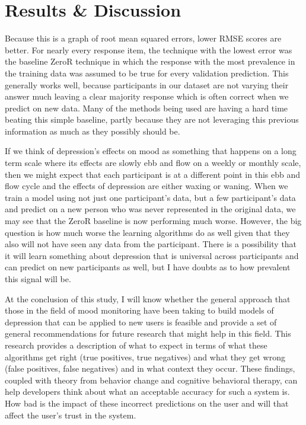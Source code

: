 \section{Results \& Discussion}

Because this is a graph of root mean squared errors, lower RMSE scores are better. For nearly every response item, the technique with the lowest error was the baseline ZeroR technique in which the response with the most prevalence in the training data was assumed to be true for every validation prediction.  This generally works well, because participants in our dataset are not varying their answer much leaving a clear majority response which is often correct when we predict on new data. Many of the methods being used are having a hard time beating this simple baseline, partly because they are not leveraging this previous information as much as they possibly should be.

If we think of depression’s effects on mood as something that happens on a long term scale where its effects are slowly ebb and flow on a weekly or monthly scale, then we might expect that each participant is at a different point in this ebb and flow cycle and the effects of depression are either waxing or waning.  When we train a model using not just one participant’s data, but a few participant’s data and predict on a new person who was never represented in the original data, we may see that the ZeroR baseline is now performing much worse.  However, the big question is how much worse the learning algorithms do as well given that they also will not have seen any data from the participant.  There is a possibility that it will learn something about depression that is universal across participants and can predict on new participants as well, but I have doubts as to how prevalent this signal will be.

At the conclusion of this study, I will know whether the general approach that those in the field of mood monitoring have been taking to build models of depression that can be applied to new users is feasible and provide a set of general recommendations for future research that might help in this field.  This research provides a description of what to expect in terms of what these algorithms get right (true positives, true negatives) and what they get wrong (false positives, false negatives) and in what context they occur.  These findings, coupled with theory from behavior change and cognitive behavioral therapy, can help developers think about what an acceptable accuracy for such a system is.  How bad is the impact of these incorrect predictions on the user and will that affect the user’s trust in the system.

